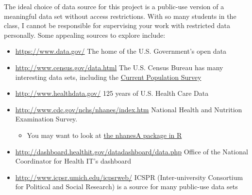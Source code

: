 \documentclass[]{book}
\providecommand{\tightlist}{%
  \setlength{\itemsep}{0pt}\setlength{\parskip}{0pt}}
\theoremstyle{definition}
\theoremstyle{definition}
\theoremstyle{definition}
\theoremstyle{remark}
\begin{document}
The ideal choice of data source for this project is a public-use version
of a meaningful data set without access restrictions. With so many
students in the class, I cannot be responsible for supervising your work
with restricted data personally. Some appealing sources to explore
include:

\begin{itemize}
\tightlist
\item
  \url{https://www.data.gov/} The home of the U.S. Government's open
  data
\item
  \url{http://www.census.gov/data.html} The U.S. Census Bureau has many
  interesting data sets, including the
  \href{http://www.census.gov/programs-surveys/cps.html}{Current
  Population Survey}
\item
  \url{http://www.healthdata.gov/} 125 years of U.S. Health Care Data
\item
  \url{http://www.cdc.gov/nchs/nhanes/index.htm} National Health and
  Nutrition Examination Survey.

  \begin{itemize}
  \tightlist
  \item
    You may want to look at
    \href{https://cran.r-project.org/web/packages/nhanesA/vignettes/Introducing_nhanesA.html}{the
    nhanesA package in R}
  \end{itemize}
\item
  \url{http://dashboard.healthit.gov/datadashboard/data.php} Office of
  the National Coordinator for Health IT's dashboard
\item
  \url{http://www.icpsr.umich.edu/icpsrweb/} ICSPR (Inter-university
  Consortium for Political and Social Research) is a source for many
  public-use data sets


\end{itemize}
\end{document}
